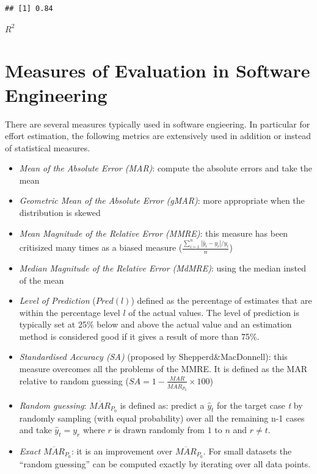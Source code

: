 \documentclass[]{book}
\begin{document}
\begin{verbatim}
## [1] 0.84
\end{verbatim}

\(R^2\)

\chapter{Measures of Evaluation in Software
Engineering}\label{evaluationSE}

There are several measures typically used in software engieering. In
particular for effort estimation, the following metrics are extensively
used in addition or instead of statistical measures.

\begin{itemize}
\item
  \emph{Mean of the Absolute Error (MAR)}: compute the absolute errors
  and take the mean
\item
  \emph{Geometric Mean of the Absolute Error (gMAR)}: more appropriate
  when the distribution is skewed
\item
  \emph{Mean Magnitude of the Relative Error (MMRE)}: this measure has
  been critisized many times as a biased measure
  (\(\frac{\sum_{i=1}^{n}{|{\hat{y}_i-y_i}|}/y_i}{n}\))
\item
  \emph{Median Magnitude of the Relative Error (MdMRE)}: using the
  median insted of the mean
\item
  \emph{Level of Prediction} (\(Pred(l)\)) defined as the percentage of
  estimates that are within the percentage level \(l\) of the actual
  values. The level of prediction is typically set at 25\% below and
  above the actual value and an estimation method is considered good if
  it gives a result of more than 75\%.
\item
  \emph{Standardised Accuracy (SA)} (proposed by Shepperd\&MacDonnell):
  this measure overcomes all the problems of the MMRE. It is defined as
  the MAR relative to random guessing
  (\(SA=1-{\frac{MAR}{\overline{MAR}_{P_0}}\times100}\))
\item
  \emph{Random guessing}: \(\overline{MAR}_{P_0}\) is defined as:
  predict a \(\hat{y}_t\) for the target case \emph{t} by randomly
  sampling (with equal probability) over all the remaining n-1 cases and
  take \(\hat{y}_t=y_r\) where \(r\) is drawn randomly from \(1\) to
  \(n\) and \(r\neq t\).
\item
  \emph{Exact \(\overline{MAR}_{P_0}\)}: it is an improvement over
  \(\overline{MAR}_{P_0}\). For small datasets the ``random guessing''
  can be computed exactly by iterating over all data points.
\end{itemize}
\end{document}
